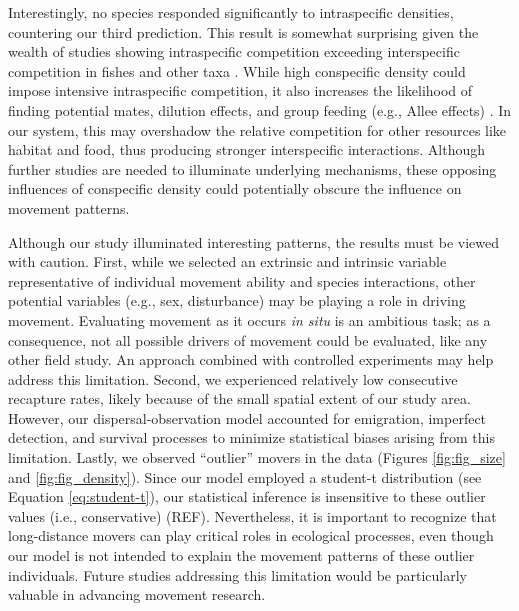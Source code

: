 \documentclass[11pt, class=article, crop=false]{standalone}
\begin{document}
Interestingly, no species responded significantly to intraspecific densities, countering our third prediction. This result is somewhat surprising given the wealth of studies showing intraspecific competition exceeding interspecific competition in fishes \citep{websterMechanismsIndividualConsequences2000, wardIntraspecificFoodCompetition2006} and other taxa \citep{adlerCompetitionCoexistencePlant2018, barabasEffectIntraInterspecific2016, thompsonProcessbasedMetacommunityFramework2020, chessonRolesHarshFluctuating1997, tilmanResourceCompetitionCommunity1982, mcpeekIntraspecificDensityDependence2012}. While high conspecific density could impose intensive intraspecific competition, it also increases the likelihood of finding potential mates, dilution effects, and group feeding (e.g., Allee effects) \citep{courchampAlleeEffectsEcology2008, gascoigneAlleeEffectsDriven2004, teruiCrypticAlleeEffect2015}. In our system, this may overshadow the relative competition for other resources like habitat and food, thus producing stronger interspecific interactions. Although further studies are needed to illuminate underlying mechanisms, these opposing influences of conspecific density could potentially obscure the influence on movement patterns. 

Although our study illuminated interesting patterns, the results must be viewed with caution. First, while we selected an extrinsic and intrinsic variable representative of individual movement ability and species interactions, other potential variables (e.g., sex, disturbance) may be playing a role in driving movement.
Evaluating movement as it occurs \textit{in situ} is an ambitious task; as a consequence, not all possible drivers of movement could be evaluated, like any other field study.
An approach combined with controlled experiments may help address this limitation.
Second, we experienced relatively low consecutive recapture rates, likely because of the small spatial extent of our study area. However, our dispersal-observation model accounted for emigration, imperfect detection, and survival processes to minimize statistical biases arising from this limitation.
Lastly, we observed ``outlier'' movers in the data (Figures \ref{fig:fig_size} and \ref{fig:fig_density}). 
Since our model employed a student-t distribution (see Equation \ref{eq:student-t}), our statistical inference is insensitive to these outlier values (i.e., conservative) (REF). 
Nevertheless, it is important to recognize that long-distance movers can play critical roles in ecological processes, even though our model is not intended to explain the movement patterns of these outlier individuals.
Future studies addressing this limitation would be particularly valuable in advancing movement research.
\end{document}
